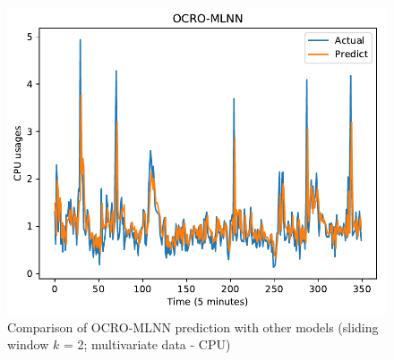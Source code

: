 \documentclass[11pt,twoside]{article}
\begin{document}
\begin{multicols}{2}
\begin{figure}[!ht]
\begin{minipage}[b]{0.33\linewidth}
    \includegraphics[width=0.9\linewidth]{predict/k2/cpu_k2_ocro_mlnn.pdf} 
  \end{minipage} 
  
  \caption{Comparison of OCRO-MLNN prediction with other models (sliding window $k$ = 2; multivariate data - CPU)} 
  \label{predict_cpu_sliding2} 
\end{figure}


\end{multicols}
\end{document}
